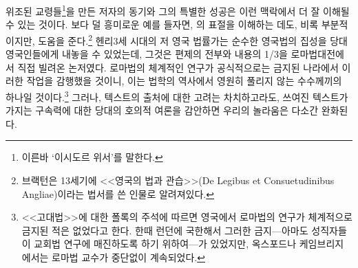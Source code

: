 위조된 교령들\footnote{%
  이른바 `이시도르 위서'를 말한다.}을
만든 저자의 동기와 그의 특별한 성공은 이런 맥락에서
더 잘 이해될 수 있는 것이다.
보다 덜 흥미로운 예를 들자면, 의 표절을 이해하는 데도,
비록 부분적이지만, 도움을 준다.\footnote{%
  브랙턴은 13세기에
  <<영국의 법과 관습>>(De Legibus et Consuetudinibus Angliae)이라는
  법서를 쓴 인물로 알려져있다. }
헨리3세 시대의 저 영국 법률가는
순수한 영국법의 집성을 당대 영국인들에게 내놓을 수 있었는데,
그것은 편제의 전부와 내용의 1/3을 로마법대전에서 직접 빌려온 논저였다.
로마법의 체계적인 연구가 공식적으로는 금지된 나라에서
이러한 작업을 감행했을 것이니,
이는 법학의 역사에서 영원히 풀리지 않는
수수께끼의 하나일 것이다.\footnote{%
  <<고대법>>에 대한 폴록의 주석에 따르면 영국에서 로마법의 연구가
  체계적으로 금지된 적은 없었다고 한다. 한때 런던에 국한해서
  그러한 금지---아마도 성직자들이 교회법 연구에 매진하도록 하기 위하여---가
  있었지만, 옥스포드나 케임브리지에서는 로마법 교수가 중단없이
  계속되었다. }
그러나, 텍스트의 출처에 대한 고려는 차치하고라도,
쓰여진 텍스트가 가지는 구속력에 대한 당대의 호의적 여론을 감안하면
우리의 놀라움은 다소간 완화된다.

